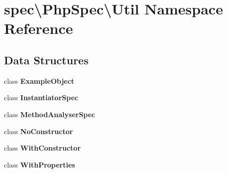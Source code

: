 \section{spec\textbackslash{}Php\+Spec\textbackslash{}Util Namespace Reference}
\label{namespacespec_1_1_php_spec_1_1_util}
\subsection*{Data Structures}
\begin{DoxyCompactItemize}
\item 
class {\bf Example\+Object}
\item 
class {\bf Instantiator\+Spec}
\item 
class {\bf Method\+Analyser\+Spec}
\item 
class {\bf No\+Constructor}
\item 
class {\bf With\+Constructor}
\item 
class {\bf With\+Properties}
\end{DoxyCompactItemize}
